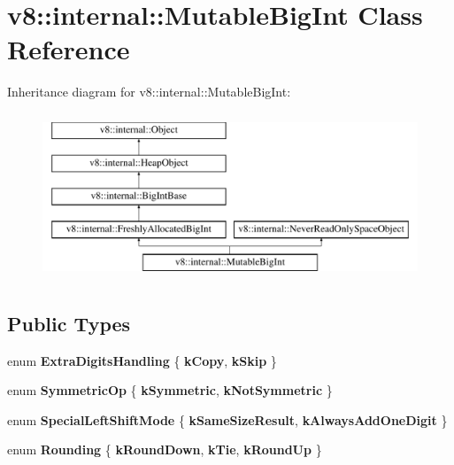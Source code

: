 \hypertarget{classv8_1_1internal_1_1MutableBigInt}{}\section{v8\+:\+:internal\+:\+:Mutable\+Big\+Int Class Reference}
\label{classv8_1_1internal_1_1MutableBigInt}
Inheritance diagram for v8\+:\+:internal\+:\+:Mutable\+Big\+Int\+:\begin{figure}[H]
\begin{center}
\leavevmode
\includegraphics[height=5.000000cm]{classv8_1_1internal_1_1MutableBigInt}
\end{center}
\end{figure}
\subsection*{Public Types}
\begin{DoxyCompactItemize}
\item 
\mbox{\label{classv8_1_1internal_1_1MutableBigInt_a511363287652767ad03efa735f6e2772}} 
enum {\bfseries Extra\+Digits\+Handling} \{ {\bfseries k\+Copy}, 
{\bfseries k\+Skip}
 \}
\item 
\mbox{\label{classv8_1_1internal_1_1MutableBigInt_ae0a348494f107f5d0f5712a6b9e0394c}} 
enum {\bfseries Symmetric\+Op} \{ {\bfseries k\+Symmetric}, 
{\bfseries k\+Not\+Symmetric}
 \}
\item 
\mbox{\label{classv8_1_1internal_1_1MutableBigInt_aa0aa6fccbe70e3059ae10192608b7c1f}} 
enum {\bfseries Special\+Left\+Shift\+Mode} \{ {\bfseries k\+Same\+Size\+Result}, 
{\bfseries k\+Always\+Add\+One\+Digit}
 \}
\item 
\mbox{\label{classv8_1_1internal_1_1MutableBigInt_a731977da9649d641ea28f55d9bb805c7}} 
enum {\bfseries Rounding} \{ {\bfseries k\+Round\+Down}, 
{\bfseries k\+Tie}, 
{\bfseries k\+Round\+Up}
 \}
\end{DoxyCompactItemize}
